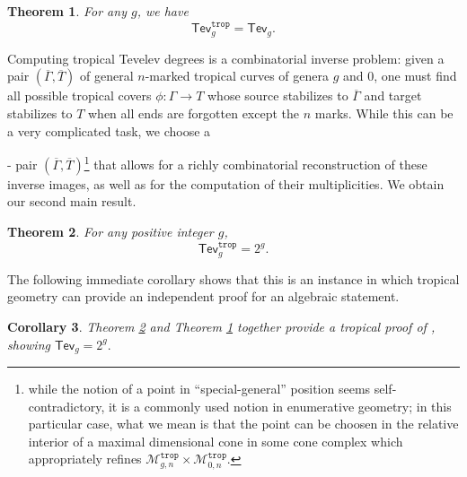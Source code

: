 \documentclass[11pt,reqno]{amsart}
\newtheorem{theorem}{Theorem}[section]
\newtheorem{corollary}[theorem]{Corollary}
\theoremstyle{definition}
\newcommand\trop{{\mathtt{trop}}}
\newcommand\Mgn[1]{\mathcal M_{#1}}
\newcommand{\Tev}{{\mathsf{Tev}}}
\begin{document}
\begin{theorem}
\label{thm:correspondence}
For any $g$, we have
\begin{equation}
    \Tev_{g}^\trop = \Tev_{g}.
\end{equation}
\end{theorem}

Computing tropical Tevelev degrees is a combinatorial inverse problem: given a pair $(\overline{\Gamma},\overline{T})$ of general $n$-marked tropical curves of genera $g$ and $0$, one must find all possible tropical covers $\phi:\Gamma\to T$ whose source stabilizes to $\overline{\Gamma}$ and target stabilizes to $T$ when all ends are forgotten except the $n$ marks. While this can be a very complicated task, we choose a 

- pair $(\overline{\Gamma},\overline{T})$\footnote{while the notion of a point in ``special-general'' position seems self-contradictory, it is a commonly used notion in enumerative geometry; in this particular case, what we mean is that the point can be choosen in the relative interior of a maximal dimensional cone in some cone complex which appropriately refines $\Mgn{g,n}^\trop\times\Mgn{0,n}^\trop$.} that allows for a richly combinatorial reconstruction of these inverse images, as well as for the computation of their multiplicities. We obtain our second main result.

\begin{theorem}\label{thm:ttev}
    For any positive integer $g$,
    \[
    \Tev^\trop_g = 2^g.
    \]
\end{theorem}
The following immediate corollary shows that this is an instance in which tropical geometry can provide an independent proof for an algebraic statement.
\begin{corollary}
    Theorem \ref{thm:ttev} and Theorem \ref{thm:correspondence} together  provide a tropical proof of \cite[Theorem 1.13]{Tevelev:2020zux}, showing \(
\Tev_g = 2^g.
    \)
    \end{corollary}
\end{document}
